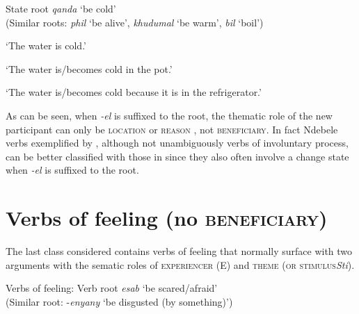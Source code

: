 \documentclass[output=paper]{langsci/langscibook}
\begin{document}
\ea\label{ex:sibanda:16}
\settowidth{}
{State root \textit{qanda} ‘be cold’}\\
 (Similar roots: \textit{phil} ‘be alive’, \textit{khudumal} ‘be warm’, \textit{bil} ‘boil’)\\

\glt ‘The water is cold.’


\glt ‘The water is/becomes cold in the pot.’


\glt ‘The water is/becomes cold because it is in the refrigerator.’
\z
\z

As can be seen, when \textit{-el} is suffixed to the root, the thematic role of the new participant can only be \textsc{location}  or \textsc{reason} , not \textsc{beneficiary}. In fact Ndebele verbs exemplified by , although not unambiguously verbs of involuntary process, can be better classified with those in  since they also often involve a change state when \textit{-el} is suffixed to the root.

\section{Verbs of feeling (no \textsc{beneficiary)}}\label{sec:sibanda:}

The last class considered contains verbs of feeling that normally surface with two arguments with the sematic roles of \textsc{experiencer} (E) and \textsc{theme} (\textsc{or stimulus}\textit {Sti}). 

\ea\label{ex:sibanda:17}
\settowidth{}
{Verbs of feeling: Verb root \textit{esab} ‘be scared/afraid’}\\
 (Similar root: -\textit{enyany} ‘be disgusted (by something)’)\\
\end{document}
